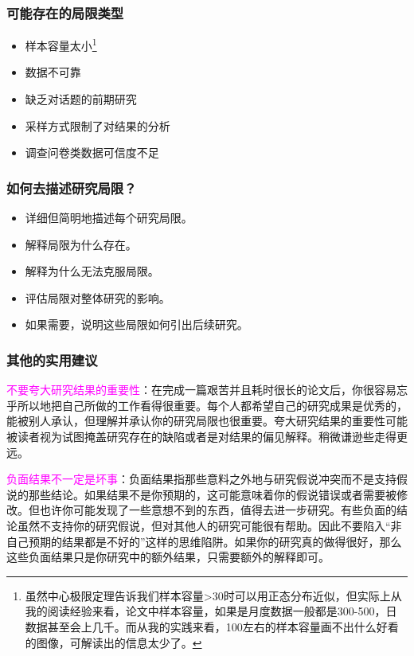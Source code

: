 \documentclass[cn,hazy,blue,14pt,screen]{elegantnote} %
\begin{document}
\subsubsection{可能存在的局限类型}

\begin{itemize}
  \item 样本容量太小\footnote{虽然中心极限定理告诉我们样本容量>30时可以用正态分布近似，但实际上从我的阅读经验来看，论文中样本容量，如果是月度数据一般都是300-500，日数据甚至会上几千。而从我的实践来看，100左右的样本容量画不出什么好看的图像，可解读出的信息太少了。}
  \item 数据不可靠
  \item 缺乏对话题的前期研究
  \item 采样方式限制了对结果的分析
  \item 调查问卷类数据可信度不足
\end{itemize}

\subsubsection{如何去描述研究局限？}

\begin{itemize}
  \item 详细但简明地描述每个研究局限。
  \item 解释局限为什么存在。
  \item 解释为什么无法克服局限。
  \item 评估局限对整体研究的影响。
  \item 如果需要，说明这些局限如何引出后续研究。
\end{itemize}

\subsubsection{其他的实用建议}

\textcolor{magenta}{不要夸大研究结果的重要性}：在完成一篇艰苦并且耗时很长的论文后，你很容易忘乎所以地把自己所做的工作看得很重要。每个人都希望自己的研究成果是优秀的，能被别人承认，但理解并承认你的研究局限也很重要。夸大研究结果的重要性可能被读者视为试图掩盖研究存在的缺陷或者是对结果的偏见解释。稍微谦逊些走得更远。

\textcolor{magenta}{负面结果不一定是坏事}：负面结果指那些意料之外地与研究假说冲突而不是支持假说的那些结论。如果结果不是你预期的，这可能意味着你的假说错误或者需要被修改。但也许你可能发现了一些意想不到的东西，值得去进一步研究。有些负面的结论虽然不支持你的研究假说，但对其他人的研究可能很有帮助。因此不要陷入“非自己预期的结果都是不好的”这样的思维陷阱。如果你的研究真的做得很好，那么这些负面结果只是你研究中的额外结果，只需要额外的解释即可。
\end{document}
